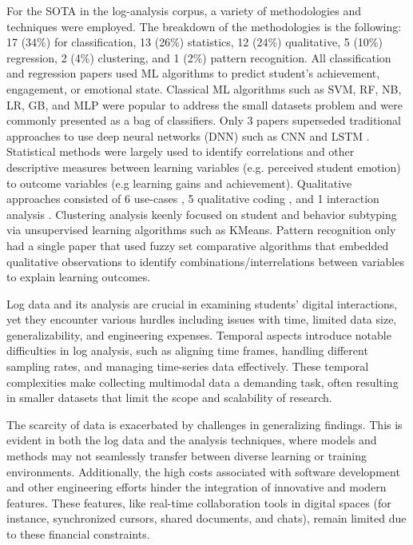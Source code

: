 \documentclass[manuscript,screen,review]{acmart}
\begin{document}
For the SOTA in the log-analysis corpus, a variety of methodologies and techniques were employed. The breakdown of the methodologies is the following: 17 (34\%) for classification, 13 (26\%) statistics, 12 (24\%) qualitative, 5 (10\%) regression, 2 (4\%) clustering, and 1 (2\%) pattern recognition. All classification and regression papers used ML algorithms to predict student's achievement, engagement, or emotional state. Classical ML algorithms such as SVM, RF, NB, LR, GB, and MLP \cite{147203129, 483140962, 1019093033, 1576545447, 1598166515, 1886134458, 2273914836, 2456887548, 2936220551, 3339002981, 3408664396, 3796643912, 4277812050, 1581261659, 3783339081, 4278392816} were popular to address the small datasets problem and were commonly presented as a bag of classifiers. Only 3 papers superseded traditional approaches to use deep neural networks (DNN) such as CNN \cite{1637690235} and LSTM \cite{2070224207, 3051560548}. Statistical methods were largely used to identify correlations and other descriptive measures between learning variables (e.g. perceived student emotion) to outcome variables (e.g learning gains and achievement). Qualitative approaches consisted of 6 use-cases \cite{666050348, 818492192, 1296637108}, 5 qualitative coding \cite{2273914836, 2936220551, 3856280479}, and 1 interaction analysis \cite{2273914836}. Clustering analysis keenly focused on student \cite{2273914836} and behavior subtyping \cite{818492192} via unsupervised learning algorithms such as KMeans. Pattern recognition only had a single paper \cite{123412197} that used fuzzy set comparative algorithms that embedded qualitative observations to identify combinations/interrelations between variables to explain learning outcomes.

Log data and its analysis are crucial in examining students' digital interactions, yet they encounter various hurdles including issues with time, limited data size, generalizability, and engineering expenses. Temporal aspects introduce notable difficulties in log analysis, such as aligning time frames, handling different sampling rates, and managing time-series data effectively. These temporal complexities make collecting multimodal data a demanding task, often resulting in smaller datasets that limit the scope and scalability of research.

The scarcity of data is exacerbated by challenges in generalizing findings. This is evident in both the log data and the analysis techniques, where models and methods may not seamlessly transfer between diverse learning or training environments. Additionally, the high costs associated with software development and other engineering efforts hinder the integration of innovative and modern features. These features, like real-time collaboration tools in digital spaces (for instance, synchronized cursors, shared documents, and chats), remain limited due to these financial constraints.
\end{document}
